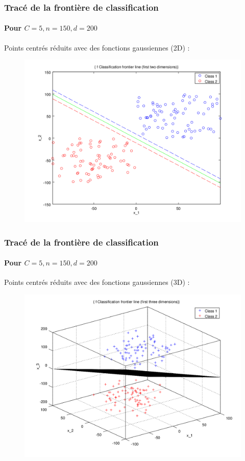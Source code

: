 \documentclass{beamer}
\begin{document}
\begin{frame}
\frametitle{Tracé de la frontière de classification}
\framesubtitle{Pour $C = 5, n = 150, d = 200$}

Points centrés réduits avec des fonctions gaussiennes (2D) :

         \begin{figure}
         \centering
         \includegraphics[scale=0.4]{images/line4.png}
         \end{figure}

\end{frame}

\begin{frame}
\frametitle{Tracé de la frontière de classification}
\framesubtitle{Pour $C = 5, n = 150, d = 200$}

Points centrés réduits avec des fonctions gaussiennes (3D) :

         \begin{figure}
         \centering
         \includegraphics[scale=0.4]{images/plane4.png}
         \end{figure}

\end{frame}
\end{document}
